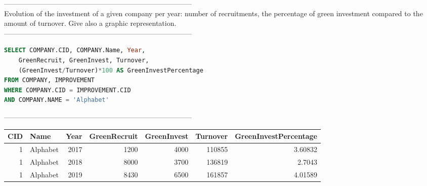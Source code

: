 --------------------------------------------------------------------------------
\\Evolution of the investment of a given company per year: number of recruitments, the percentage of green investment compared to the amount of turnover. Give also a graphic representation.\\
--------------------------------------------------------------------------------
\begin{lstlisting}[language = SQL]
SELECT COMPANY.CID, COMPANY.Name, Year,
	GreenRecruit, GreenInvest, Turnover, 
	(GreenInvest/Turnover)*100 AS GreenInvestPercentage
FROM COMPANY, IMPROVEMENT 
WHERE COMPANY.CID = IMPROVEMENT.CID
AND COMPANY.NAME = 'Alphabet'
\end{lstlisting}
--------------------------------------------------------------------------------\\\begin{tabular}{rlrrrrr}
\toprule
   CID & Name     &   Year &   GreenRecruit &   GreenInvest &   Turnover &   GreenInvestPercentage \\
\midrule
     1 & Alphabet &   2017 &           1200 &          4000 &     110855 &                 3.60832 \\
     1 & Alphabet &   2018 &           8000 &          3700 &     136819 &                 2.7043  \\
     1 & Alphabet &   2019 &           8430 &          6500 &     161857 &                 4.01589 \\
\bottomrule
\end{tabular}